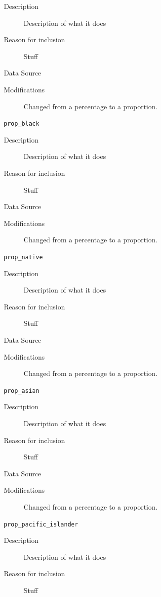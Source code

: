 \documentclass{article}
\begin{document}
\begin{itemize}[label={}, align=left]
\begin{description}
              \item[Description] Description of what it does
              \item[Reason for inclusion] Stuff
              \item[Data Source] \cite{acs_demographics_data}
              \item[Modifications] Changed from a percentage to a proportion.
          \end{description}
    \item[\texttt{prop\_black}] \
          \begin{description}
              \item[Description] Description of what it does
              \item[Reason for inclusion] Stuff
              \item[Data Source] \cite{acs_demographics_data}
              \item[Modifications] Changed from a percentage to a proportion.
          \end{description}
    \item[\texttt{prop\_native}] \
          \begin{description}
              \item[Description] Description of what it does
              \item[Reason for inclusion] Stuff
              \item[Data Source] \cite{acs_demographics_data}
              \item[Modifications] Changed from a percentage to a proportion.
          \end{description}
    \item[\texttt{prop\_asian}] \
          \begin{description}
              \item[Description] Description of what it does
              \item[Reason for inclusion] Stuff
              \item[Data Source] \cite{acs_demographics_data}
              \item[Modifications] Changed from a percentage to a proportion.
          \end{description}
    \item[\texttt{prop\_pacific\_islander}] \
          \begin{description}
              \item[Description] Description of what it does
              \item[Reason for inclusion] Stuff

\end{description}
\end{itemize}
\end{document}
